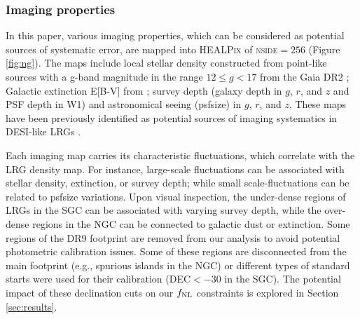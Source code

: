\subsubsection{Imaging properties}
In this paper, various imaging properties, which can be considered as potential sources of systematic error, are mapped into \textsc{HEALPix} of \textsc{nside}$=256$ (Figure \ref{fig:ng}). The maps include local stellar density constructed from point-like sources with a g-band magnitude in the range $12 \leq g < 17$ from the Gaia DR2 \citep[see,][]{gaiadr2, myers2022}; Galactic extinction E[B-V] from \cite{schlegel1998maps}; survey depth (galaxy depth in $g$, $r$, and $z$ and PSF depth in W1) and astronomical seeing (psfsize) in $g$, $r$, and $z$. These maps have been previously identified as potential sources of imaging systematics in DESI-like LRGs \cite{zhou2022target}.

Each imaging map carries its characteristic fluctuations, which correlate with the LRG density map. For instance, large-scale fluctuations can be associated with stellar density, extinction, or survey depth; while small scale-fluctuations can be related to psfsize variations. Upon visual inspection, the under-dense regions of LRGs in the SGC can be associated with varying survey depth, while the over-dense regions in the NGC can be connected to galactic dust or extinction. Some regions of the DR9 footprint are removed from our analysis to avoid potential photometric calibration issues. Some of these regions are disconnected from the main footprint (e.g., spurious islands in the NGC) or different types of standard starts were used for their calibration (DEC$<-30$ in the SGC). The potential impact of these declination cuts on our $f_{\rm NL}$ constraints is explored in Section \ref{sec:results}. 

